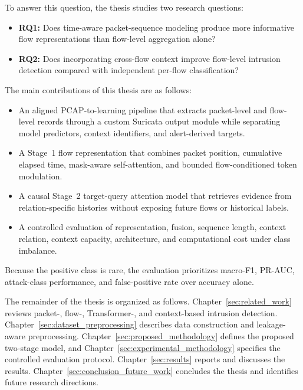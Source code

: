 \documentclass[11pt,fleqn]{report}
\begin{document}
To answer this question, the thesis studies two research questions:

\begin{itemize}
    \item \textbf{RQ1:} Does time-aware packet-sequence modeling produce more informative flow representations than flow-level aggregation alone?
    \item \textbf{RQ2:} Does incorporating cross-flow context improve flow-level intrusion detection compared with independent per-flow classification?
\end{itemize}

The main contributions of this thesis are as follows:

\begin{itemize}
    \item An aligned PCAP-to-learning pipeline that extracts packet-level and
    flow-level records through a custom Suricata output module while separating
    model predictors, context identifiers, and alert-derived targets.
    \item A Stage~1 flow representation that combines packet position,
    cumulative elapsed time, mask-aware self-attention, and bounded
    flow-conditioned token modulation.
    \item A causal Stage~2 target-query attention model that retrieves evidence
    from relation-specific histories without exposing future flows or
    historical labels.
    \item A controlled evaluation of representation, fusion, sequence length,
    context relation, context capacity, architecture, and computational cost
    under class imbalance.
\end{itemize}

Because the positive class is rare, the evaluation prioritizes macro-F1,
PR-AUC, attack-class performance, and false-positive rate over accuracy alone.

The remainder of the thesis is organized as follows.
Chapter~\ref{sec:related_work} reviews packet-, flow-, Transformer-, and
context-based intrusion detection. Chapter~\ref{sec:dataset_preprocessing}
describes data construction and leakage-aware preprocessing.
Chapter~\ref{sec:proposed_methodology} defines the proposed two-stage model,
and Chapter~\ref{sec:experimental_methodology} specifies the controlled
evaluation protocol. Chapter~\ref{sec:results} reports and discusses the
results. Chapter~\ref{sec:conclusion_future_work} concludes the thesis and
identifies future research directions.
\end{document}
